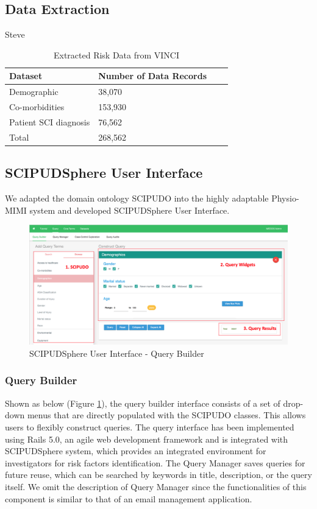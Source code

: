 \documentclass{amia}
\begin{document}
\subsection{Data Extraction}
Steve

\begin{table}[!ht]
\centering
\caption{Extracted Risk Data from VINCI}
  \begin{tabular}{|l|l|l|l|}
  \hline
    \textbf{Dataset}  & \textbf{Number of Data Records} \\ \hline
    Demographic & 38,070 \\ \hline
    Co-morbidities  & 153,930 \\ \hline
    Patient SCI diagnosis  & 76,562 \\ \hline
    Total & 268,562 \\ \hline
  \end{tabular}
\end{table}

\subsection{SCIPUDSphere User Interface}
We adapted the domain ontology SCIPUDO into the highly adaptable Physio-MIMI system and developed SCIPUDSphere User Interface. 

\begin{figure}[h!]
  \centering
  \includegraphics[scale=0.4]{pics/interface.png}
  \caption{SCIPUDSphere User Interface - Query Builder}
  \label{interface}
\end{figure}

\subsubsection{Query Builder}
Shown as below (Figure \ref{interface}), the query builder interface consists of a set of drop-down menus that are directly populated with the SCIPUDO classes. This allows users to flexibly construct queries. The query interface has been implemented using Rails 5.0, an agile web development framework and is integrated with SCIPUDSphere system, which provides an integrated environment for investigators for risk factors identification. The Query Manager saves queries for future reuse, which can be searched by keywords in title, description, or the query itself. We omit the description of Query Manager since the functionalities of this component is similar to that of an email management application.
\end{document}
